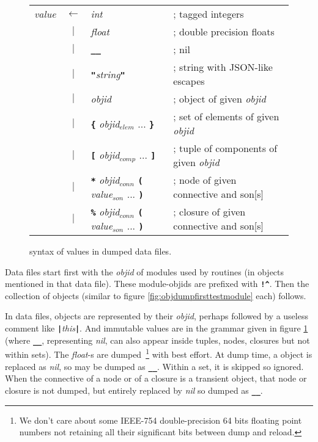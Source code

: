 \begin{figure}[h]
  \begin{center}
  \begin{tabular}{l c l l}
    \emph{value} & $\leftarrow$ & \emph{int} & ; tagged integers \\
                 & $|$ & \emph{float} & ; double precision floats \\
                 & $|$ & \texttt{\textbf{\_\_}} & ; nil \\
                 & $|$ & \texttt{\textbf{"}}\emph{string}\texttt{\textbf{"}} & ; string  {\scriptsize with JSON-like escapes} \\
                 & $|$ & \emph{objid} & ; object  {\scriptsize of given \emph{objid}}\\
                 & $|$ & \texttt{\textbf{\{}} \emph{objid}$_{elem}$ {...} \texttt{\textbf{\}}}  & ; set  {\scriptsize of elements of given \emph{objid}}\\
                 & $|$ & \texttt{\textbf{[}} \emph{objid}$_{comp}$ {...} \texttt{\textbf{]}}  & ; tuple  {\scriptsize of components of given \emph{objid}}\\
                 & $|$ & \texttt{\textbf{*}} \emph{objid}$_{conn}$ \texttt{\textbf{(}} \emph{value}$_{son}$ {...} \texttt{\textbf{)}}  & ; node {\scriptsize of given connective and son[s]}\\
                 & $|$ & \texttt{\textbf{\%}} \emph{objid}$_{conn}$ \texttt{\textbf{(}} \emph{value}$_{son}$ {...} \texttt{\textbf{)}}  & ; closure {\scriptsize of given connective and son[s]}\\
  \end{tabular}
  \end{center}
  \caption{syntax of values in dumped data files.}
  \label{fig:dumpvalsyntax}
\end{figure}

Data files start first with the \emph{objid} of modules used by
routines (in objects mentioned in that data file). These module-objids
are prefixed with {\bf{\verb+!^+}}. Then the collection of
objects (similar to figure \ref{fig:objdumpfirsttestmodule} each)
follows.

In data files, objects are represented by their \emph{objid}, perhaps
followed by a useless comment like
{\bf{\verb+|+}}\emph{this}{\bf{\verb+|+}}. And immutable values are in
the grammar given in figure \ref{fig:dumpvalsyntax} (where
\textbf{\texttt{\_\_}}, representing \emph{nil}, can also appear
inside tuples, nodes, closures but not within sets). The
\emph{float}-s are dumped~\footnote{ We don't care about some IEEE-754
  double-precision 64 bits floating point numbers not retaining all
  their significant bits between dump and reload.} with best
effort. At dump time, a  object is
replaced as \emph{nil}, so may be dumped as
\textbf{\texttt{\_\_}}. Within a set, it is skipped so ignored. When
the connective of a node or of a closure is a transient object, that
node or closure is not dumped, but entirely replaced by \emph{nil} so
dumped as \textbf{\texttt{\_\_}}.

